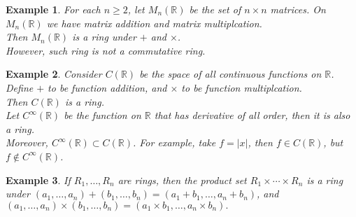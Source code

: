 \documentclass{article}
\theoremstyle{MyNonumberplain}
\theoremstyle{break}
\newcommand{\nin}{\not\in}
\theoremstyle{break}
\newtheorem{example}{Example}[section]
\theoremstyle{break}
\theoremstyle{definition}
\theoremstyle{break}
\begin{document}
\begin{expbox}
    \begin{example}
        For each $n \geq 2$, let $M_n (\mathbb{R})$ be the set of $n \times n$
        matrices. On $M_n (\mathbb{R})$ we have matrix addition and matrix
        multiplcation.\\
        
        Then $M_n (\mathbb{R})$ is a ring under $+$ and $\times$.\\
        
        However, such ring is not a commutative ring.
    \end{example}
\end{expbox}

\begin{expbox}
    \begin{example}
        Consider $C (\mathbb{R})$ be the space of all continuous functions on
        $\mathbb{R}$.\\
        
        Define $+$ to be function addition, and $\times$ to be function multiplcation.\\
        
        Then $C (\mathbb{R})$ is a ring.\\
        
        Let $C^{\infty} (\mathbb{R})$ be the function on $\mathbb{R}$ that has
        derivative of all order, then it is also a ring.\\
        
        Moreover, $C^{\infty} (\mathbb{R}) \subset C (\mathbb{R})$. For example, take
        $f = | x |$, then $f \in C (\mathbb{R})$, but $f \nin C^{\infty}
        (\mathbb{R})$.
    \end{example}
\end{expbox}

\begin{expbox}
    \begin{example}
        If $R_1, \ldots, R_n$ are rings, then the product set $R_1 \times \cdots
        \times R_n$ is a ring under $(a_1, \ldots, a_n) + (b_1, \ldots, b_n) = (a_1 + b_1, \ldots, a_n + b_n)$, and $(a_1, \ldots, a_n) \times (b_1, \ldots, b_n) = (a_1 \times b_1, \ldots, a_n \times b_n).$
    \end{example}
\end{expbox}
\end{document}

